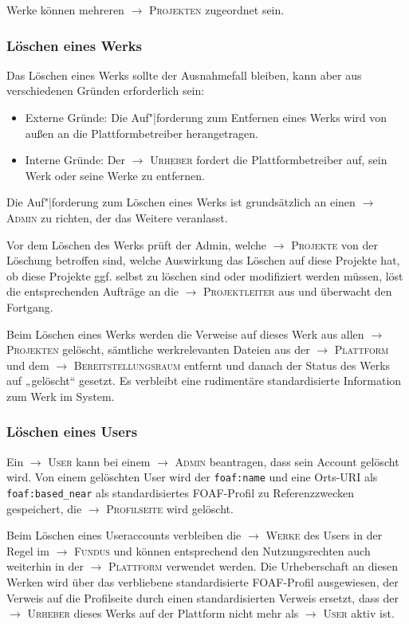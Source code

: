 \documentclass[a4paper,11pt]{article}
\newcommand{\glossar}[1]{{$\to$ \textsc{#1}}}
\begin{document}
Werke können mehreren \glossar{Projekten} zugeordnet sein. 

\subsubsection{Löschen eines Werks}\label{werk.loeschen}

Das Löschen eines Werks sollte der Ausnahmefall bleiben, kann aber aus
verschiedenen Gründen erforderlich sein:
\begin{itemize}
\item Externe Gründe: Die Auf"|forderung zum Entfernen eines Werks wird von
  außen an die Plattformbetreiber herangetragen.
\item Interne Gründe: Der \glossar{Urheber} fordert die Plattformbetreiber
  auf, sein Werk oder seine Werke zu entfernen.
\end{itemize}
Die Auf"|forderung zum Löschen eines Werks ist grundsätzlich an einen
\glossar{Admin} zu richten, der das Weitere veranlasst.

Vor dem Löschen des Werks prüft der Admin, welche \glossar{Projekte} von der
Löschung betroffen sind, welche Auswirkung das Löschen auf diese Projekte hat,
ob diese Projekte ggf. selbst zu löschen sind oder modifiziert werden müssen,
löst die entsprechenden Aufträge an die \glossar{Projektleiter} aus und
überwacht den Fortgang.

Beim Löschen eines Werks werden die Verweise auf dieses Werk aus allen
\glossar{Projekten} gelöscht, sämtliche werkrelevanten Dateien aus der
\glossar{Plattform} und dem \glossar{Bereitstellungsraum} entfernt und danach
der Status des Werks auf „gelöscht“ gesetzt.  Es verbleibt eine rudimentäre
standardisierte Information zum Werk im System.

\subsubsection{Löschen eines Users}\label{nutzer.loeschen}

Ein \glossar{User} kann bei einem \glossar{Admin} beantragen, dass sein Account
gelöscht wird.  Von einem gelöschten User wird der \texttt{foaf:name} und eine
Orts-URI als \texttt{foaf:based\_near} als standardisiertes FOAF-Profil zu
Referenzzwecken gespeichert, die \glossar{Profilseite} wird gelöscht.

Beim Löschen eines Useraccounts verbleiben die \glossar{Werke} des Users in
der Regel im \glossar{Fundus} und können entsprechend den Nutzungsrechten auch
weiterhin in der \glossar{Plattform} verwendet werden.  Die Urheberschaft an
diesen Werken wird über das verbliebene standardisierte FOAF-Profil
ausgewiesen, der Verweis auf die Profilseite durch einen standardisierten
Verweis ersetzt, dass der \glossar{Urheber} dieses Werks auf der Plattform
nicht mehr als \glossar{User} aktiv ist.
\end{document}
